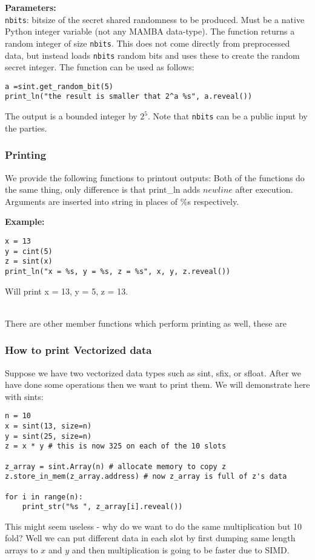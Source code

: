 \textbf{Parameters:}\\
	\verb|nbits|: bitsize of the secret shared randomness to be produced. Must be a native Python integer variable (not any MAMBA data-type).
The function returns a random integer of size \verb|nbits|. This does not come directly from preprocessed data, but instead loads \verb|nbits| random bits and uses these to create the random secret integer. The function can be used as follows:
\begin{lstlisting}
a =sint.get_random_bit(5)
print_ln("the result is smaller that 2^a %s", a.reveal())
\end{lstlisting}
The output is a bounded integer by $2^5$. Note that \verb|nbits| can be a public input by the parties. 

\subsubsection{Printing}
We provide the following functions to printout outputs:
Both of the functions do the same thing, only difference is that print_ln adds $newline$ after execution. Arguments are inserted into string in places of $\%$s respectively. 

\noindent
\textbf{Example:}
\begin{lstlisting}
x = 13
y = cint(5)
z = sint(x)
print_ln("x = %s, y = %s, z = %s", x, y, z.reveal())
\end{lstlisting}
Will print x = 13, y = 5, z = 13.

~\\

\noindent
There are other member functions which perform printing as well, these are


\subsubsection{How to print Vectorized data}
Suppose we have two vectorized data types such as sint, sfix, or sfloat. After we have done some operations then we want to print them. We will demonstrate here with sints:

\begin{lstlisting}
n = 10
x = sint(13, size=n)
y = sint(25, size=n)
z = x * y # this is now 325 on each of the 10 slots

z_array = sint.Array(n) # allocate memory to copy z
z.store_in_mem(z_array.address) # now z_array is full of z's data

for i in range(n):
	print_str("%s ", z_array[i].reveal())
\end{lstlisting}
This might seem useless - why do we want to do the same multiplication but 10 fold? Well we can put different data in each slot by first dumping same length arrays to $x$ and $y$ and then multiplication is going to be faster due to SIMD.

